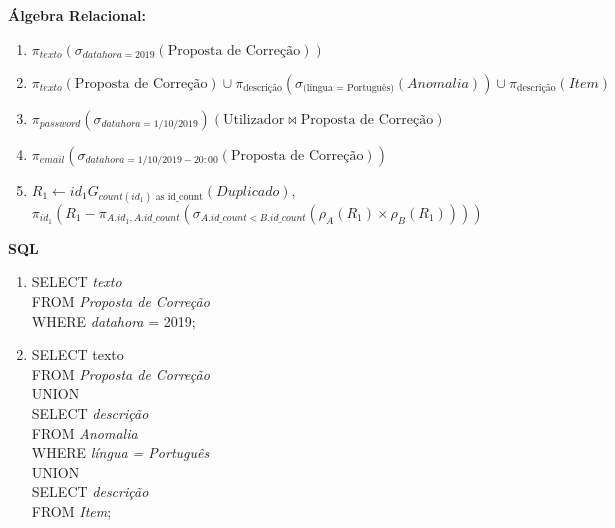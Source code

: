 \documentclass[12pt]{report}
\begin{document}
\newpage
\Large
\textbf{Álgebra Relacional: }\\

\large

\begin{enumerate}
	\item $\pi_{texto}(\sigma_{datahora = 2019}(\text{Proposta de Correção}))$
	\item $\pi_{texto}(\text{Proposta de Correção}) \cup \pi_{\text{descrição}}(\sigma_{\text{(língua = Português)}}(Anomalia)) \cup
		\pi_{\text{descrição}}(Item)$
	\item $\pi_{password}(\sigma_{datahora = 1/10/2019})(\text{Utilizador}\bowtie\text{Proposta de Correção})$
	\item $\pi_{email}(\sigma_{datahora = 1/10/2019 - 20:00}(\text{Proposta de Correção}))$
	\item $R_{1} \gets id_{1}G_{count(id_{1}) \text{ as id\_count}}(Duplicado),$\\
		$ \pi_{id_{1}}(R_{1} - \pi_{A.id_{1}, A.id\_count}(\sigma_{A.id\_count < B.id\_count}(\rho_{A}(R_{1}) \times \rho_{B}(R_{1}))))$
\end{enumerate}

\Large
\textbf{SQL}

\normalsize

\begin{enumerate}
	\item SELECT \textit{texto} \\
		FROM \textit{Proposta de Correção} \\
		WHERE \textit{datahora} = 2019;
	\item SELECT texto \\
		FROM \textit{Proposta de Correção} \\
		UNION \\
		SELECT \textit{descrição} \\
		FROM \textit{Anomalia} \\
		WHERE \textit{língua = Português} \\
		UNION \\
		SELECT \textit{descrição} \\
		FROM \textit{Item};
\end{enumerate}
\end{document}
